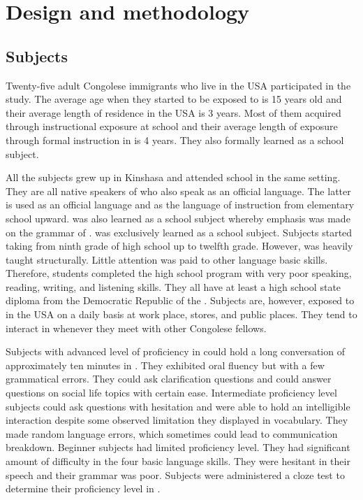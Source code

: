 \documentclass[output=paper,
modfonts
]{langscibook}
\begin{document}
\section{Design and methodology}\label{sec:kabasele:5}
\largerpage
\subsection{Subjects}

Twenty-five adult Congolese immigrants who live in the USA participated in the study. The average age when they started to be exposed to  is 15 years old and their average length of residence in the USA is 3 years. Most of them acquired  through instructional exposure at school and their average length of exposure through formal instruction in  is 4 years. They also formally learned  as a school subject.

All the subjects grew up in Kinshasa and attended school in the same setting. They are all native speakers of  who also speak  as an official language. The latter is used as an official language and as the language of instruction from elementary school upward.  was also learned as a school subject whereby emphasis was made on the grammar of .  was exclusively learned as a school subject. Subjects started taking  from ninth grade of high school up to twelfth grade. However,  was heavily taught structurally. Little attention was paid to other language basic skills. Therefore, students completed the high school program with very poor speaking, reading, writing, and listening skills. They all have at least a high school state diploma from the Democratic Republic of the . Subjects are, however, exposed to  in the USA on a daily basis at work place, stores, and public places. They tend to interact in  whenever they meet with other Congolese fellows. 

Subjects with advanced level of proficiency in  could hold a long conversation of approximately ten minutes in . They exhibited oral fluency but with a few grammatical errors. They could ask clarification questions and could answer questions on social life topics with certain ease. Intermediate proficiency level subjects could ask questions with hesitation and were able to hold an intelligible interaction despite some observed limitation they displayed in vocabulary. They made random language errors, which sometimes could lead to communication breakdown. Beginner subjects had limited  proficiency level. They had significant amount of difficulty in the four basic language skills. They were hesitant in their speech and their grammar was poor.  Subjects were administered a cloze test to determine their proficiency level in .
\end{document}
